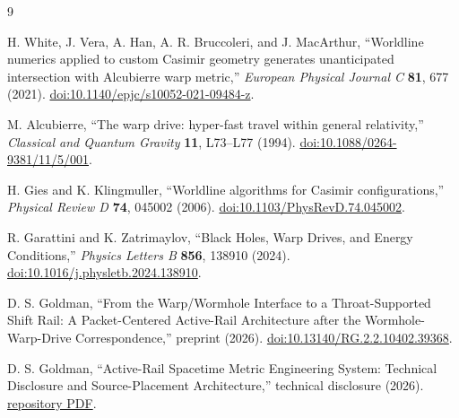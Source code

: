\documentclass[11pt]{article}
\begin{document}
\begin{thebibliography}{9}

H. White, J. Vera, A. Han, A. R. Bruccoleri, and J. MacArthur,
``Worldline numerics applied to custom Casimir geometry generates
unanticipated intersection with Alcubierre warp metric,''
\emph{European Physical Journal C} \textbf{81}, 677 (2021).
\href{https://doi.org/10.1140/epjc/s10052-021-09484-z}{doi:10.1140/epjc/s10052-021-09484-z}.

M. Alcubierre,
``The warp drive: hyper-fast travel within general relativity,''
\emph{Classical and Quantum Gravity} \textbf{11}, L73--L77 (1994).
\href{https://doi.org/10.1088/0264-9381/11/5/001}{doi:10.1088/0264-9381/11/5/001}.

H. Gies and K. Klingmuller,
``Worldline algorithms for Casimir configurations,''
\emph{Physical Review D} \textbf{74}, 045002 (2006).
\href{https://doi.org/10.1103/PhysRevD.74.045002}{doi:10.1103/PhysRevD.74.045002}.

R. Garattini and K. Zatrimaylov,
``Black Holes, Warp Drives, and Energy Conditions,''
\emph{Physics Letters B} \textbf{856}, 138910 (2024).
\href{https://doi.org/10.1016/j.physletb.2024.138910}{doi:10.1016/j.physletb.2024.138910}.

D. S. Goldman,
``From the Warp/Wormhole Interface to a Throat-Supported Shift Rail:
A Packet-Centered Active-Rail Architecture after the Wormhole-Warp-Drive
Correspondence,'' preprint (2026).
\href{https://doi.org/10.13140/RG.2.2.10402.39368}{doi:10.13140/RG.2.2.10402.39368}.

D. S. Goldman,
``Active-Rail Spacetime Metric Engineering System: Technical Disclosure and
Source-Placement Architecture,'' technical disclosure (2026).
\href{https://github.com/dgoldman0/spacetime-metric-engineering/blob/main/active_rail_technical_disclosure.pdf}{repository PDF}.

\end{thebibliography}
\end{document}
